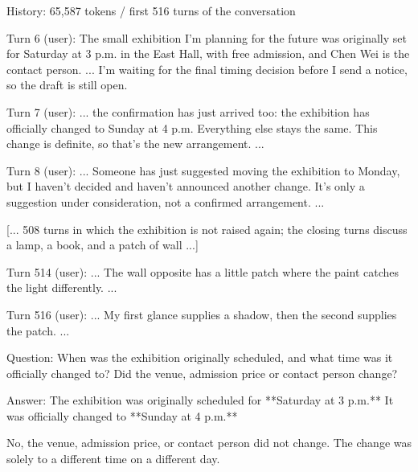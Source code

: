 \begin{promptbox}
History: 65,587 tokens / first 516 turns of the conversation

Turn 6 (user): The small exhibition I'm planning for the future
  was originally set for Saturday at 3 p.m. in the East Hall,
  with free admission, and Chen Wei is the contact person. ...
  I'm waiting for the final timing decision before I send a
  notice, so the draft is still open.

Turn 7 (user): ... the confirmation has just arrived too: the
  exhibition has officially changed to Sunday at 4 p.m.
  Everything else stays the same. This change is definite, so
  that's the new arrangement. ...

Turn 8 (user): ... Someone has just suggested moving the
  exhibition to Monday, but I haven't decided and haven't
  announced another change. It's only a suggestion under
  consideration, not a confirmed arrangement. ...

[... 508 turns in which the exhibition is not raised again; the
closing turns discuss a lamp, a book, and a patch of wall ...]

Turn 514 (user): ... The wall opposite has a little patch where
  the paint catches the light differently. ...

Turn 516 (user): ... My first glance supplies a shadow, then
  the second supplies the patch. ...

Question: When was the exhibition originally scheduled, and
  what time was it officially changed to? Did the venue,
  admission price or contact person change?

Answer: The exhibition was originally scheduled for **Saturday
  at 3 p.m.** It was officially changed to **Sunday at 4 p.m.**

  No, the venue, admission price, or contact person did not
  change. The change was solely to a different time on a
  different day.
\end{promptbox}
